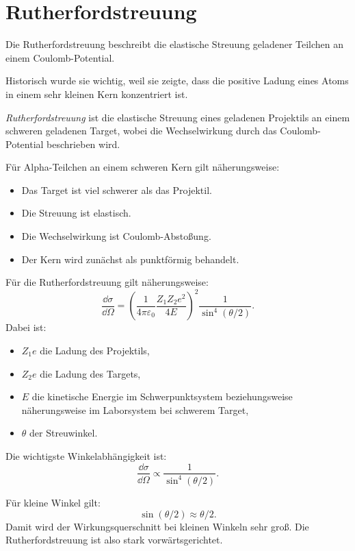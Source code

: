 \section{Rutherfordstreuung}

Die Rutherfordstreuung beschreibt die elastische Streuung geladener Teilchen an
einem Coulomb-Potential.

Historisch wurde sie wichtig, weil sie zeigte, dass die positive Ladung eines Atoms
in einem sehr kleinen Kern konzentriert ist.

\begin{definitionbox}
\emph{Rutherfordstreuung} ist die elastische Streuung eines geladenen Projektils an
einem schweren geladenen Target, wobei die Wechselwirkung durch das Coulomb-Potential
beschrieben wird.
\end{definitionbox}

\begin{conceptbox}
Für Alpha-Teilchen an einem schweren Kern gilt näherungsweise:
\begin{itemize}
    \item Das Target ist viel schwerer als das Projektil.
    \item Die Streuung ist elastisch.
    \item Die Wechselwirkung ist Coulomb-Abstoßung.
    \item Der Kern wird zunächst als punktförmig behandelt.
\end{itemize}
\end{conceptbox}

\begin{formulabox}
Für die Rutherfordstreuung gilt näherungsweise:
\[
    \frac{\dd\sigma}{\dd\Omega}
    =
    \left(
        \frac{1}{4\pi\varepsilon_0}
        \frac{Z_1Z_2e^2}{4E}
    \right)^2
    \frac{1}{\sin^4(\theta/2)}.
\]
Dabei ist:
\begin{itemize}
    \item $Z_1e$ die Ladung des Projektils,
    \item $Z_2e$ die Ladung des Targets,
    \item $E$ die kinetische Energie im Schwerpunktsystem beziehungsweise näherungsweise im Laborsystem bei schwerem Target,
    \item $\theta$ der Streuwinkel.
\end{itemize}
\end{formulabox}

\begin{conceptbox}
Die wichtigste Winkelabhängigkeit ist:
\[
    \frac{\dd\sigma}{\dd\Omega}
    \propto
    \frac{1}{\sin^4(\theta/2)}.
\]

Für kleine Winkel gilt:
\[
    \sin(\theta/2)\approx \theta/2.
\]
Damit wird der Wirkungsquerschnitt bei kleinen Winkeln sehr groß.
Die Rutherfordstreuung ist also stark vorwärtsgerichtet.
\end{conceptbox}

